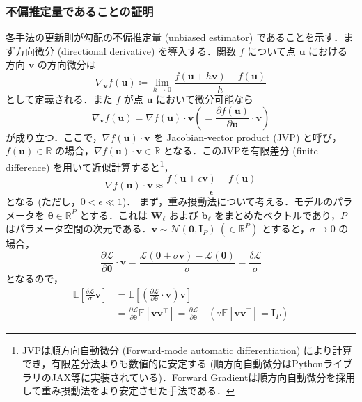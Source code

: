 \subsubsection{不偏推定量であることの証明}
各手法の更新則が勾配の不偏推定量 (unbiased estimator) であることを示す．まず方向微分 (directional derivative) を導入する．関数 $f$ について点 $\mathbf{u}$ における方向 $\mathbf{v}$ の方向微分は
\begin{equation}
\nabla_\mathbf{v}f(\mathbf{u})\coloneqq  \lim_{h\to 0} \frac{f(\mathbf{u}+h\mathbf{v}) - f(\mathbf{u})}{h}
\end{equation}
として定義される．また $f$ が点 $\mathbf{u}$ において微分可能なら
\begin{equation}
\nabla_\mathbf{v}f(\mathbf{u})=\nabla f(\mathbf{u})\cdot \mathbf{v}\left(=\frac{\partial f(\mathbf{u})}{\partial \mathbf{u}}\cdot \mathbf{v}\right)
\end{equation}
が成り立つ．ここで，$\nabla f(\mathbf{u})\cdot \mathbf{v}$ を Jacobian-vector product (JVP) と呼び，$f(\mathbf{u})\in \mathbb{R}$ の場合，$\nabla f(\mathbf{u})\cdot \mathbf{v}\in \mathbb{R}$ となる．このJVPを有限差分 (finite difference) を用いて近似計算すると\footnote{JVPは順方向自動微分 (Forward-mode automatic differentiation) により計算でき，有限差分法よりも数値的に安定する (順方向自動微分はPythonライブラリのJAX等に実装されている)．Forward Gradientは順方向自動微分を採用して重み摂動法をより安定させた手法である．}，
\begin{equation}
\nabla f(\mathbf{u})\cdot \mathbf{v} \approx \frac{f(\mathbf{u}+\epsilon \mathbf{v}) - f(\mathbf{u})}{\epsilon}
\end{equation}
となる (ただし，$0 < \epsilon \ll 1$)．
まず，重み摂動法について考える．モデルのパラメータを $\boldsymbol{\theta} \in \mathbb{R}^P$ とする．これは $\mathbf{W}_\ell$ および $\mathbf{b}_\ell$ をまとめたベクトルであり，$P$ はパラメータ空間の次元である．$\mathbf{v} \sim \mathcal{N}(\mathbf{0}, \mathbf{I}_P)\ (\in \mathbb{R}^P)$ とすると，$\sigma\to 0$ の場合，
\begin{equation}
\frac{\partial \mathcal{L}}{\partial \boldsymbol{\theta}}\cdot \mathbf{v} = \frac{\mathcal{L}(\boldsymbol{\theta}+\sigma \mathbf{v}) - \mathcal{L}(\boldsymbol{\theta})}{\sigma}=\frac{\delta \mathcal{L}}{\sigma}
\end{equation}
となるので，
\begin{align}
\mathbb{E}\left[\frac{\delta \mathcal{L}}{\sigma}\mathbf{v}\right] &=
\mathbb{E}\left[\left(\frac{\partial \mathcal{L}}{\partial \boldsymbol{\theta}}\cdot \mathbf{v}\right)\mathbf{v}\right]\\
&=\frac{\partial \mathcal{L}}{\partial \boldsymbol{\theta}} \mathbb{E}[\mathbf{v} \mathbf{v}^\top]=\frac{\partial \mathcal{L}}{\partial \boldsymbol{\theta}}\quad \left(\because \mathbb{E}[\mathbf{v} \mathbf{v}^\top]=\mathbf{I}_P\right)
\end{align}

